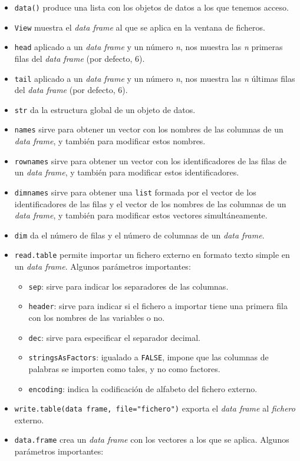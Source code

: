 \documentclass[]{book}
\providecommand{\tightlist}{%
  \setlength{\itemsep}{0pt}\setlength{\parskip}{0pt}}
\theoremstyle{definition}
\theoremstyle{definition}
\theoremstyle{definition}
\theoremstyle{remark}
\begin{document}
\begin{itemize}
\tightlist
\item
  \texttt{data()} produce una lista con los objetos de datos a los que tenemos acceso.
\item
  \texttt{View} muestra el \emph{data frame} al que se aplica en la ventana de ficheros.
\item
  \texttt{head} aplicado a un \emph{data frame} y un número \emph{n}, nos muestra las \emph{n} primeras filas del \emph{data frame} (por defecto, 6).
\item
  \texttt{tail} aplicado a un \emph{data frame} y un número \emph{n}, nos muestra las \emph{n} últimas filas del \emph{data frame} (por defecto, 6).
\item
  \texttt{str} da la estructura global de un objeto de datos.
\item
  \texttt{names} sirve para obtener un vector con los nombres de las columnas de un \emph{data frame}, y también para modificar estos nombres.
\item
  \texttt{rownames} sirve para obtener un vector con los identificadores de las filas de un \emph{data frame}, y también para modificar estos identificadores.
\item
  \texttt{dimnames} sirve para obtener una \texttt{list} formada por el vector de los identificadores de las filas y el vector de los nombres de las columnas de un \emph{data frame}, y también para modificar estos vectores simultáneamente.
\item
  \texttt{dim} da el número de filas y el número de columnas de un \emph{data frame}.
\item
  \texttt{read.table} permite importar un fichero externo en formato texto simple en un \emph{data frame}. Algunos parámetros importantes:

  \begin{itemize}
  \tightlist
  \item
    \texttt{sep}: sirve para indicar los separadores de las columnas.
  \item
    \texttt{header}: sirve para indicar si el fichero a importar tiene una primera fila con los nombres de las variables o no.
  \item
    \texttt{dec}: sirve para especificar el separador decimal.
  \item
    \texttt{stringsAsFactors}: igualado a \texttt{FALSE}, impone que las columnas de palabras se importen como tales, y no como factores.
  \item
    \texttt{encoding}: indica la codificación de alfabeto del fichero externo.
  \end{itemize}
\item
  \texttt{write.table(data\ frame,\ file="fichero")} exporta el \emph{data frame} al \emph{fichero} externo.
\item
  \texttt{data.frame} crea un \emph{data frame} con los vectores a los que se aplica. Algunos parámetros importantes:


\end{itemize}
\end{document}
